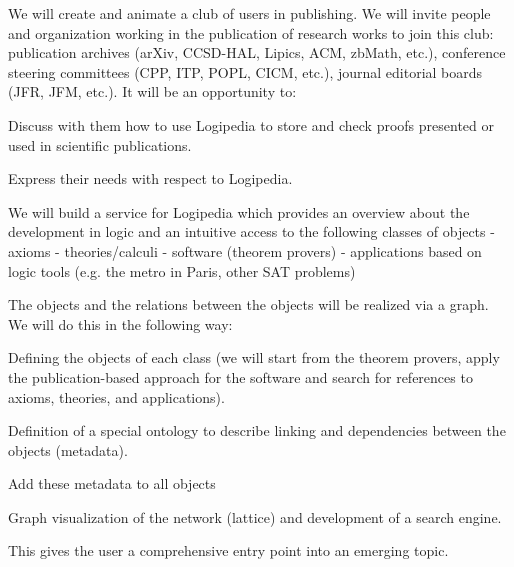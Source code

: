 \begin{workpackage}[id=dissemination,type=MGT,wphases=1-48,
  short={Dissemination},
  title={Dissemination, communication and exploitation},
  lead=Lie,LieRM=1,InrRM=6,BirRM=4,CleRM=2,ImtRM=2,StrRM=2,ZibRM=14,EduRM=12]
\begin{tasklist}
\begin{task}[id=teachers-club,
      title=Expanding the use of Logipedia in education,
      shorttitle=Educ.,
      lead=Str,StrRM=2,wphases=1-48!.05]
  \end{task}

  \begin{task}[id=publishers-club,
      title=Expanding the use of Logipedia in publishing,
      shorttitle=Pub.,
      lead=Zib,ZibRM=2,wphases=1-48!.05]
    We will create and animate a club of users in publishing. We will invite
    people and organization working in the publication of research
    works to join this club: publication archives (arXiv, CCSD-HAL,
    Lipics, ACM, zbMath, etc.), conference steering committees (CPP,
    ITP, POPL, CICM, etc.), journal editorial boards (JFR, JFM,
    etc.). It will be an opportunity to:
    \begin{compactitem}
    \item Discuss with them how to use Logipedia to store and check
      proofs presented or used in scientific publications.
    \item Express their needs with respect to Logipedia.
    \end{compactitem}
  \end{task}

  \begin{task}[id=zib,
      title=Linking scientific publications to Logipedia,
      shorttitle=Pub. link,
      lead=Zib,ZibRM=12,wphases=12-23]
    We will build a service for Logipedia which provides an overview
    about the development in logic and an intuitive access to the
    following classes of objects - axioms - theories/calculi -
    software (theorem provers) - applications based on logic tools
    (e.g. the metro in Paris, other SAT problems)

    The objects and the relations between the objects will be
    realized via a graph. We will do this in the following way:
    \begin{compactitem}
    \item Defining the objects of each class (we will start from the
      theorem provers, apply the publication-based approach for the
      software and search for references to axioms, theories, and
      applications).
    \item Definition of a special ontology to describe linking and
      dependencies between the objects (metadata).
    \item Add these metadata to all objects
    \item Graph visualization of the network (lattice) and development
      of a search engine.
    \end{compactitem}
    This gives the user a comprehensive entry point into an emerging
    topic.
  \end{task}


\end{tasklist}
\end{workpackage}

